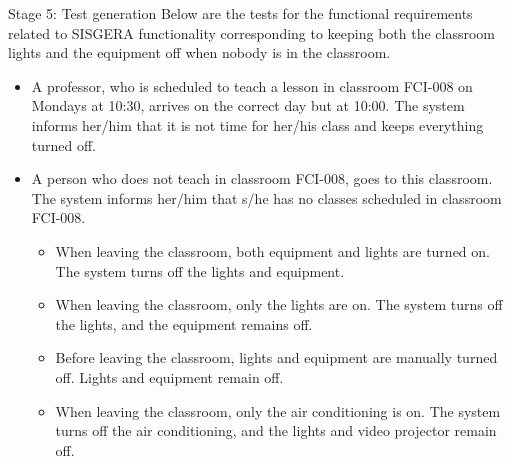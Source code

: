 \documentclass[notes=show, 10pt]{beamer}
\begin{document}
    \begin{frame}{Stage 5: Test generation}
            Below are the tests for the functional requirements related to SISGERA functionality corresponding to keeping both the classroom lights and the equipment off when nobody is in the classroom.
            \begin{itemize}
                \item A professor, who is scheduled to teach a lesson in classroom FCI-008 on Mondays at 10:30, arrives on the correct day but at 10:00. The system informs her/him that it is not time for her/his class and keeps everything turned off.
                \item A person who does not teach in classroom FCI-008, goes to this classroom. The system informs her/him that s/he has no classes scheduled in classroom FCI-008.
                \begin{itemize}
                    \item When leaving the classroom, both equipment and lights are turned on. The system turns off the lights and equipment.
                    \item When leaving the classroom, only the lights are on. The system turns off the lights, and the equipment remains off.
                    \item Before leaving the classroom, lights and equipment are manually turned off. Lights and equipment remain off.
                    \item When leaving the classroom, only the air conditioning is on. The system turns off the air conditioning, and the lights and video projector remain off.
                \end{itemize}
            \end{itemize}
    \end{frame}
    
\end{document}
